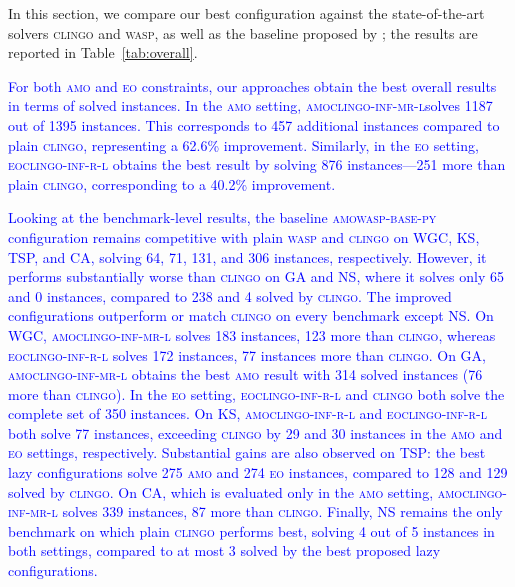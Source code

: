 \documentclass[preprint,authoryear]{elsarticle}
\newcommand{\clingo}{\textsc{clingo}\xspace}
\newcommand{\amowaspij}{\textsc{amowasp-base-py}\xspace}
\newcommand{\amoclingoinfrlazy}{\textsc{amoclingo-inf-r-l}\xspace}
\newcommand{\amoclingoinfmrlazy}{\textsc{amoclingo-inf-mr-l}\xspace}
\newcommand{\eoclingoinfrlazy}{\textsc{eoclingo-inf-r-l}\xspace}
\theoremstyle{definition}
\begin{document}
In this section, we compare our best configuration against the state-of-the-art solvers \textsc{clingo} and \textsc{wasp}, as well as the baseline proposed by \cite{DBLP:conf/ijcai/AlvianoDFM24}; the results are reported in Table~\ref{tab:overall}.

\textcolor{blue}{For both \textsc{amo} and \textsc{eo} constraints, our approaches obtain the best overall results in terms of solved instances. In the \textsc{amo} setting, \amoclingoinfmrlazy \textcolor{blue}{solves 1187 out of 1395 instances}. This corresponds to \textcolor{blue}{457} additional instances compared to plain \textsc{clingo}, representing a 62.6\% improvement. Similarly, in the \textsc{eo} setting, \eoclingoinfrlazy obtains the best result by solving 876 instances—251 more than plain \textsc{clingo}, corresponding to a 40.2\% improvement.}

\textcolor{blue}{Looking at the benchmark-level results, the baseline \amowaspij configuration remains competitive with plain \textsc{wasp} and \textsc{clingo} on WGC, KS, TSP, and CA, solving 64, 71, 131, and 306 instances, respectively. However, it performs substantially worse than \textsc{clingo} on GA and NS, where it solves only 65 and 0 instances, compared to 238 and 4 solved by \textsc{clingo}.
The improved configurations outperform or match \textsc{clingo} on every benchmark except NS. On WGC, \amoclingoinfmrlazy solves 183 instances, 123 more than \textsc{clingo}, whereas \eoclingoinfrlazy solves 172 instances, 77 instances more than \clingo.
On GA, \amoclingoinfmrlazy obtains the best \textsc{amo} result with 314 solved instances (76 more than \textsc{clingo}). In the \textsc{eo} setting, \eoclingoinfrlazy and \textsc{clingo} both solve the complete set of 350 instances.
On KS, \amoclingoinfrlazy and \eoclingoinfrlazy both solve 77 instances, exceeding \textsc{clingo} by 29 and 30 instances in the \textsc{amo} and \textsc{eo} settings, respectively. 
Substantial gains are also observed on TSP: the best lazy configurations solve 275 \textsc{amo} and 274 \textsc{eo} instances, compared to 128 and 129 solved by \textsc{clingo}. 
On CA, which is evaluated only in the \textsc{amo} setting, \amoclingoinfmrlazy solves 339 instances, 87 more than \textsc{clingo}. 
Finally, NS remains the only benchmark on which plain \textsc{clingo} performs best, solving 4 out of 5 instances in both settings, compared to at most 3 solved by the best proposed lazy configurations.}
\end{document}
